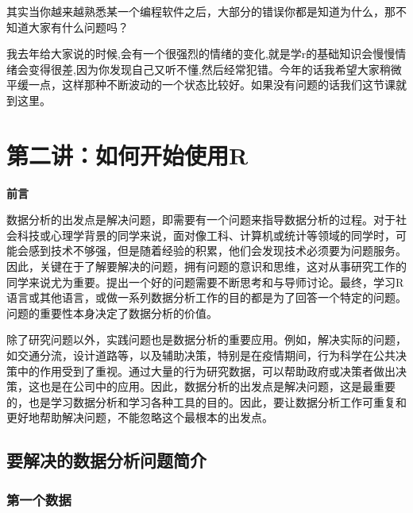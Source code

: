 \documentclass[
  oneside]{book}
\begin{document}
其实当你越来越熟悉某一个编程软件之后，大部分的错误你都是知道为什么，那不知道大家有什么问题吗？

我去年给大家说的时候,会有一个很强烈的情绪的变化,就是学r的基础知识会慢慢情绪会变得很差,因为你发现自己又听不懂,然后经常犯错。今年的话我希望大家稍微平缓一点，这样那种不断波动的一个状态比较好。如果没有问题的话我们这节课就到这里。

\hypertarget{lesson-2}{%
\chapter{第二讲：如何开始使用R}\label{lesson-2}}

\textbf{前言}

数据分析的出发点是解决问题，即需要有一个问题来指导数据分析的过程。对于社会科技或心理学背景的同学来说，面对像工科、计算机或统计等领域的同学时，可能会感到技术不够强，但是随着经验的积累，他们会发现技术必须要为问题服务。因此，关键在于了解要解决的问题，拥有问题的意识和思维，这对从事研究工作的同学来说尤为重要。提出一个好的问题需要不断思考和与导师讨论。最终，学习R语言或其他语言，或做一系列数据分析工作的目的都是为了回答一个特定的问题。问题的重要性本身决定了数据分析的价值。

除了研究问题以外，实践问题也是数据分析的重要应用。例如，解决实际的问题，如交通分流，设计道路等，以及辅助决策，特别是在疫情期间，行为科学在公共决策中的作用受到了重视。通过大量的行为研究数据，可以帮助政府或决策者做出决策，这也是在公司中的应用。因此，数据分析的出发点是解决问题，这是最重要的，也是学习数据分析和学习各种工具的目的。因此，要让数据分析工作可重复和更好地帮助解决问题，不能忽略这个最根本的出发点。

\hypertarget{2-data-for-lesson}{%
\section{要解决的数据分析问题简介}\label{2-data-for-lesson}}

\hypertarget{2-data-1}{%
\subsection{第一个数据}\label{2-data-1}}
\end{document}
